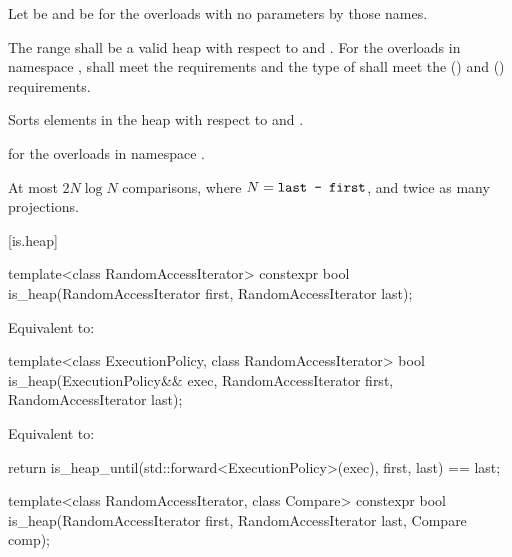 \begin{itemdescr}
\pnum
Let  be 
and  be 
for the overloads with no parameters by those names.

\pnum
\requires
The range  shall be
a valid heap with respect to  and .
For the overloads in namespace ,
 shall meet the
 requirements and
the type of  shall meet the
 () and
 () requirements.

\pnum
\effects
Sorts elements in the heap
 with respect to  and .

\pnum
\returns
{} for the overloads in namespace .

\pnum
\complexity
At most $2N \log N$
comparisons, where
$N = \texttt{last - first}$, and twice as many projections.
\end{itemdescr}

[is.heap]{}

%
\begin{itemdecl}
template<class RandomAccessIterator>
  constexpr bool is_heap(RandomAccessIterator first, RandomAccessIterator last);
\end{itemdecl}

\begin{itemdescr}
\pnum
\effects
Equivalent to: 
\end{itemdescr}

%
\begin{itemdecl}
template<class ExecutionPolicy, class RandomAccessIterator>
  bool is_heap(ExecutionPolicy&& exec,
               RandomAccessIterator first, RandomAccessIterator last);
\end{itemdecl}

\begin{itemdescr}
\pnum
\effects
Equivalent to:
\begin{codeblock}
return is_heap_until(std::forward<ExecutionPolicy>(exec), first, last) == last;
\end{codeblock}
\end{itemdescr}


%
\begin{itemdecl}
template<class RandomAccessIterator, class Compare>
  constexpr bool is_heap(RandomAccessIterator first, RandomAccessIterator last,
                         Compare comp);
\end{itemdecl}

